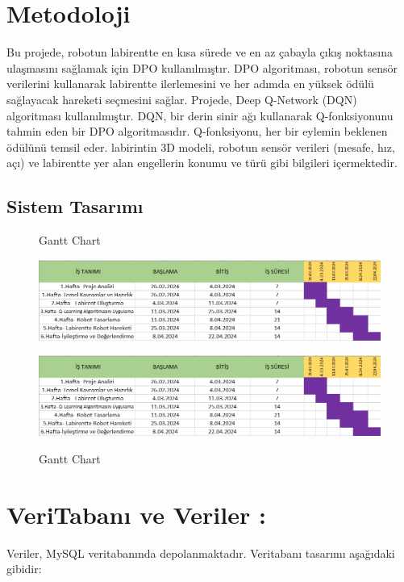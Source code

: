 \documentclass[12pt, a4paper]{article}
\begin{document}
	
	\section{Metodoloji} 
Bu projede, robotun labirentte en kısa sürede ve en az çabayla çıkış noktasına ulaşmasını sağlamak için DPO kullanılmıştır. DPO algoritması, robotun sensör verilerini kullanarak labirentte ilerlemesini ve her adımda en yüksek ödülü sağlayacak hareketi seçmesini sağlar.
Projede, Deep Q-Network (DQN) algoritması kullanılmıştır. DQN, bir derin sinir ağı kullanarak Q-fonksiyonunu tahmin eden bir DPO algoritmasıdır. Q-fonksiyonu, her bir eylemin beklenen ödülünü temsil eder.
labirintin 3D modeli, robotun sensör verileri (mesafe, hız, açı) ve labirentte yer alan engellerin konumu ve türü gibi bilgileri  içermektedir.
\newpage
\begin{landscape}
	\subsection{Sistem Tasarımı}
	\begin{figure}[!ht]
		\caption[]{Gantt Chart}
		\centering
		\includegraphics[height= 5 cm]{gantt_chart.png}
		\label{gantt}
		
			\caption[]{Gantt Chart}
		\centering
		\includegraphics[height= 5 cm]{gantt_chart.png}
		\label{gantt}
		
	\end{figure}
\end{landscape}	

	
\section {VeriTabanı ve Veriler :}%
Veriler, MySQL veritabanında depolanmaktadır. Veritabanı tasarımı aşağıdaki gibidir:
\end{document}
